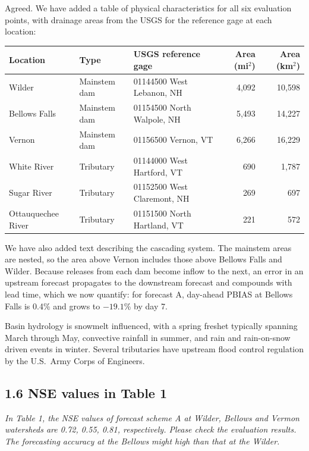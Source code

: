 \documentclass[11pt]{article}
\newenvironment{rc}%
  {\begin{list}{}{\setlength{\leftmargin}{1.5em}\setlength{\rightmargin}{1.5em}%
   \setlength{\topsep}{0.2em}\setlength{\parsep}{0pt}\setlength{\itemsep}{0pt}}%
   \item[]\itshape\color{quotegray}}%
  {\end{list}}
\begin{document}
Agreed. We have added a table of physical characteristics for all six evaluation points,
with drainage areas from the USGS for the reference gage at each location:

\begin{center}
\small
\begin{tabular}{lllrr}
\toprule
Location & Type & USGS reference gage & Area (mi$^2$) & Area (km$^2$) \\
\midrule
Wilder             & Mainstem dam & 01144500 West Lebanon, NH   & 4,092 & 10,598 \\
Bellows Falls      & Mainstem dam & 01154500 North Walpole, NH  & 5,493 & 14,227 \\
Vernon             & Mainstem dam & 01156500 Vernon, VT         & 6,266 & 16,229 \\
White River        & Tributary    & 01144000 West Hartford, VT  &   690 &  1,787 \\
Sugar River        & Tributary    & 01152500 West Claremont, NH &   269 &    697 \\
Ottauquechee River & Tributary    & 01151500 North Hartland, VT &   221 &    572 \\
\bottomrule
\end{tabular}
\end{center}

We have also added text describing the cascading system. The mainstem areas are nested, so the
area above Vernon includes those above Bellows Falls and Wilder. Because releases from each dam
become inflow to the next, an error in an upstream forecast propagates to the downstream
forecast and compounds with lead time, which we now quantify: for forecast A, day-ahead PBIAS at
Bellows Falls is 0.4\% and grows to $-19.1$\% by day 7.

Basin hydrology is snowmelt influenced, with a spring freshet typically spanning March
through May, convective rainfall in summer, and rain and rain-on-snow driven events in
winter. Several tributaries have upstream flood control regulation by the U.S.\ Army Corps
of Engineers.

\subsection*{1.6 NSE values in Table 1}

\begin{rc}
In Table 1, the NSE values of forecast scheme A at Wilder, Bellows and Vermon
watersheds are 0.72, 0.55, 0.81, respectively. Please check the evaluation results.
The forecasting accuracy at the Bellows might high than that at the Wilder.
\end{rc}
\end{document}
